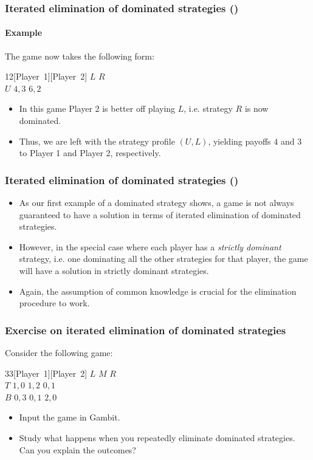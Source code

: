 \documentclass[10pt]{beamer}
\theoremstyle{definition}
\begin{document}
\begin{frame}[fragile]
\frametitle{Iterated elimination of dominated strategies ()}
\framesubtitle{Example }
The game now takes the following form:
\begin{center}
\begin{game}{1}{2}[Player~1][Player~2]
 \> $ L $ \>  $ R $ \\
$ U $ \> $ 4,3 $ \>  $ 6,2 $ \\
\end{game}
\end{center}\bigskip

\begin{itemize}\itemsep1em
\item In this game Player 2 is better off playing $ L $, i.e. strategy $ R $ is now dominated.
\item Thus, we are left with the strategy profile $ (U,L) $, yielding payoffs $ 4 $ and $ 3 $ to Player 1 and Player 2, respectively.
\end{itemize}
\end{frame}


\begin{frame}[fragile]
\frametitle{Iterated elimination of dominated strategies ()}
\begin{itemize}\itemsep1em
\item As our first example of a dominated strategy shows, a game is not always guaranteed to have a solution in terms of iterated elimination of dominated strategies.
\item However, in the special case where each player has a \emph{strictly dominant} strategy, i.e. one dominating all the other strategies for that player, the game will have a solution in strictly dominant strategies.
\item Again, the assumption of common knowledge is crucial for the elimination procedure to work.
\end{itemize}
\end{frame}


\begin{frame}[fragile]
\frametitle{Exercise on iterated elimination of dominated strategies}
Consider the following game:
\begin{center}
\begin{game}{3}{3}[Player~1][Player~2]
 \> $ L $ \> $ M $ \> $ R $ \\
$ T $ \> $ 1,0 $ \> $ 1,2 $ \> $ 0,1 $ \\
$ B $ \> $ 0,3 $ \> $ 0,1 $ \> $ 2,0 $
\end{game}
\end{center}\bigskip

\begin{itemize}\itemsep1em
\item Input the game in Gambit.
\item Study what happens when you repeatedly eliminate dominated strategies. Can you explain the outcomes?
\end{itemize}

\end{frame}
\end{document}

